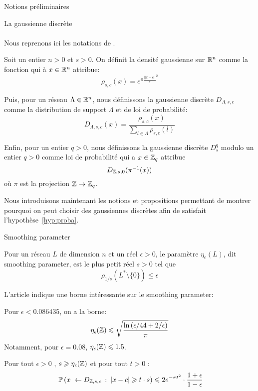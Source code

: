 \begin{section}{Notions préliminaires}
\begin{subsection}{La gaussienne discrète}
	\paragraph{}
Nous reprenons ici les notations de \cite{STOC:GenPeiVai08}.

Soit un entier $n > 0$  et $s > 0$. On définit la densité gaussienne sur $\mathbb{R}^n$ comme la fonction qui à $x\in\mathbb{R}^n$
attribue:
\[\rho_{s,c}(x) = e^{\pi {\frac{||x-c||}{s}}^2} \]

Puis, pour un réseau $\Lambda \in \mathbb{R}^n$, nous définissons la gaussienne discrète $D_{\Lambda,s,c}$ comme la
distribution de support $\Lambda$ et de loi de probabilité: 	
\[ D_{\Lambda, s, c}(x) = \frac{\rho_{s,c}(x)}{\sum_{l\in \Lambda}\rho_{s,c}(l)}\]

Enfin, pour un entier $q > 0$, nous définissons la gaussienne discrète $D^q_{s}$ modulo un entier $q > 0$ comme loi de
probabilité qui a $x \in \mathbb{Z}_q$ attribue 
	\[ D_{\mathbb{Z}, s, 0}(\pi^{-1}(x)) \]
où $\pi$ est la projection $\mathbb{Z} \rightarrow \mathbb{Z}_q$.


Nous introduisons maintenant les notions et propositions permettant de montrer pourquoi on peut choisir 
des gaussiennes discrètes afin de satisfait l'hypothèse~\ref{hyp:proba}.

\begin{definition}{Smoothing parameter}

Pour un réseau $L$ de dimension $n$ et un réel $\epsilon > 0$, le paramètre $\eta_\epsilon(L)$, dit smoothing parameter,
est le plus petit réel $s>0$ tel que 
	\[\rho_{1/s}(L^* \setminus \{0\}) \leqslant \epsilon\]
\end{definition}

L'article \cite{cryptoeprint:2018:786} indique une borne intéressante sur le smoothing parameter:
\begin{prop}
Pour $\epsilon < 0.086435$, on a la borne:
\[\eta_{\epsilon}(\mathbb{Z})  \leqslant \sqrt{\frac{\ln\left(\epsilon/44 + 2/\epsilon\right)}{\pi}} \]
Notamment, pour $\epsilon = 0.08$, $\eta_\epsilon(\mathbb{Z}) \leqslant 1.5$.
\end{prop}

\begin{prop}
\label{gaussienne}
Pour tout $\epsilon > 0$ , $s \geqslant \eta_{\epsilon}(\mathbb{Z})$ et pour tout $t>0$ :
\[ \PP\left(x \leftarrow D_{\ZZ, s,c}\: :\: |x-c| \geqslant t\cdot s\right) \leqslant 2 e^{-\pi t^2}	\cdot \frac{1+\epsilon}{1-\epsilon} \]
\end{prop}


\end{subsection}
\end{section}
